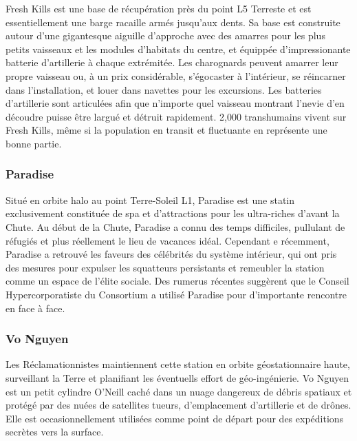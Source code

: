                                                          Fresh Kills est une base de récupération près du point L5 Terreste et est essentiellement une barge racaille armés jusqu'aux dents. Sa base est construite autour d'une gigantesque aiguille d'approche avec des amarres pour les plus petits vaisseaux et les modules d'habitats du centre, et équippée d'impressionante batterie d'artillerie à chaque extrémitée. Les charognards peuvent amarrer leur propre vaisseau ou, à un prix considérable, s'égocaster à l'intérieur, se réincarner dans l'installation, et louer dans navettes pour les excursions. Les batteries d'artillerie sont articulées afin que n'importe quel vaisseau montrant l'nevie d'en découdre puisse être largué et détruit rapidement. 2,000 transhumains vivent sur Fresh Kills, même si la population en transit et fluctuante en représente une bonne partie. 

                                                         \subsubsection{Paradise} \label{sec:paradise} 

                                                         Situé en orbite halo au point Terre-Soleil L1, Paradise est une statin exclusivement constituée de spa et d'attractions pour les ultra-riches d'avant la Chute. Au début de la Chute, Paradise a connu des temps difficiles, pullulant de réfugiés et plus réellement le lieu de vacances idéal. Cependant e récemment, Paradise a retrouvé les faveurs des célébrités du système intérieur, qui ont pris des mesures pour expulser les squatteurs persistants et remeubler la station comme un espace de l'élite sociale. Des rumerus récentes suggèrent que le Conseil Hypercorporatiste du Consortium a utilisé Paradise pour d'importante rencontre en face à face. 

                                                         \subsubsection{Vo Nguyen} \label{sec:vo-nguyen} 

                                                         Les Réclamationnistes maintiennent cette station en orbite géostationnaire haute, surveillant la Terre et planifiant les éventuells effort de géo-ingénierie. Vo Nguyen est un petit cylindre O'Neill caché dans un nuage dangereux de débris spatiaux et protégé par des nuées de satellites tueurs, d'emplacement d'artillerie et de drônes. Elle est occasionnellement utilisées comme point de départ pour des expéditions secrètes vers la surface. 

